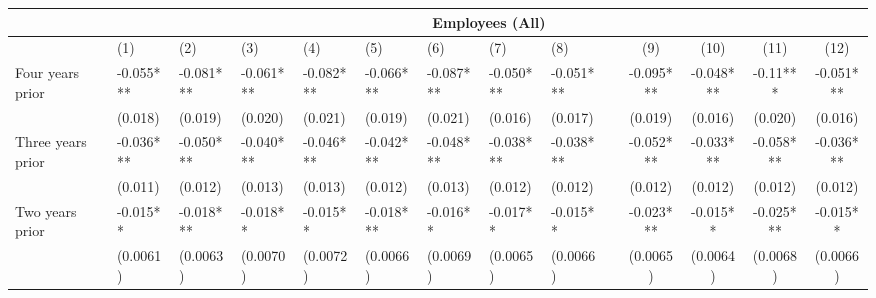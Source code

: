 \begin{tabular}{lccccrrrrrcccc}
\toprule
      & \multicolumn{13}{c}{Employees (All)} \\
\midrule
      & \multicolumn{1}{l}{(1)} & \multicolumn{1}{l}{(2)} & \multicolumn{1}{l}{(3)} & \multicolumn{1}{l}{(4)} & \multicolumn{1}{l}{(5)} & \multicolumn{1}{l}{(6)} & \multicolumn{1}{l}{(7)} & \multicolumn{1}{l}{(8)} &       & (9)   & (10)  & (11)  & (12) \\
\midrule
\midrule
Four years prior & \multicolumn{1}{l}{-0.055***} & \multicolumn{1}{l}{-0.081***} & \multicolumn{1}{l}{-0.061***} & \multicolumn{1}{l}{-0.082***} & \multicolumn{1}{l}{-0.066***} & \multicolumn{1}{l}{-0.087***} & \multicolumn{1}{l}{-0.050***} & \multicolumn{1}{l}{-0.051***} &       & -0.095*** & -0.048*** & -0.11*** & -0.051*** \\
      & \multicolumn{1}{l}{(0.018)} & \multicolumn{1}{l}{(0.019)} & \multicolumn{1}{l}{(0.020)} & \multicolumn{1}{l}{(0.021)} & \multicolumn{1}{l}{(0.019)} & \multicolumn{1}{l}{(0.021)} & \multicolumn{1}{l}{(0.016)} & \multicolumn{1}{l}{(0.017)} &       & (0.019) & (0.016) & (0.020) & (0.016) \\
Three years prior & \multicolumn{1}{l}{-0.036***} & \multicolumn{1}{l}{-0.050***} & \multicolumn{1}{l}{-0.040***} & \multicolumn{1}{l}{-0.046***} & \multicolumn{1}{l}{-0.042***} & \multicolumn{1}{l}{-0.048***} & \multicolumn{1}{l}{-0.038***} & \multicolumn{1}{l}{-0.038***} &       & -0.052*** & -0.033*** & -0.058*** & -0.036*** \\
      & \multicolumn{1}{l}{(0.011)} & \multicolumn{1}{l}{(0.012)} & \multicolumn{1}{l}{(0.013)} & \multicolumn{1}{l}{(0.013)} & \multicolumn{1}{l}{(0.012)} & \multicolumn{1}{l}{(0.013)} & \multicolumn{1}{l}{(0.012)} & \multicolumn{1}{l}{(0.012)} &       & (0.012) & (0.012) & (0.012) & (0.012) \\
Two years prior & \multicolumn{1}{l}{-0.015**} & \multicolumn{1}{l}{-0.018***} & \multicolumn{1}{l}{-0.018**} & \multicolumn{1}{l}{-0.015**} & \multicolumn{1}{l}{-0.018***} & \multicolumn{1}{l}{-0.016**} & \multicolumn{1}{l}{-0.017**} & \multicolumn{1}{l}{-0.015**} &       & -0.023*** & -0.015** & -0.025*** & -0.015** \\
      & \multicolumn{1}{l}{(0.0061)} & \multicolumn{1}{l}{(0.0063)} & \multicolumn{1}{l}{(0.0070)} & \multicolumn{1}{l}{(0.0072)} & \multicolumn{1}{l}{(0.0066)} & \multicolumn{1}{l}{(0.0069)} & \multicolumn{1}{l}{(0.0065)} & \multicolumn{1}{l}{(0.0066)} &       & (0.0065) & (0.0064) & (0.0068) & (0.0066) \\

\end{tabular}
